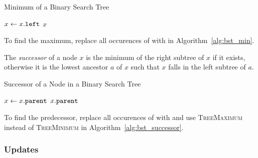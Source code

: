 \begin{algorithm}[htb]
  \caption{Minimum of a Binary Search Tree}
  \label{alg:bst_min}
  \begin{algorithmic}[1]
      \State $x\gets x\mathtt{.}\mathtt{left}$ 
      \EndWhile
      \State \Return $x$
    \EndFunction
  \end{algorithmic}
\end{algorithm}
To find the maximum, replace all occurences of  with  in Algorithm~\ref{alg:bst_min}.

\begin{definition}[Successor]
  The \emph{successor} of a node \(x\) is the minimum of the right subtree of \(x\) if it exists, otherwise it is the lowest ancestor \(a\) of \(x\) such that \(x\) falls in the left subtree of \(a\).
\end{definition}

\begin{algorithm}[htb]
  \caption{Successor of a Node in a Binary Search Tree}
  \label{alg:bst_successor}
  \begin{algorithmic}[1]
        \State \Return {} 
      \EndIf
        \State $x\gets x\mathtt{.}\mathtt{parent}$ 
      \EndWhile
      \State \Return $x\mathtt{.}\mathtt{parent}$ 
    \EndFunction
  \end{algorithmic}
\end{algorithm}
To find the predecessor, replace all occurences of  with  and use \textsc{TreeMaximum} instead of \textsc{TreeMinimum} in Algorithm~\ref{alg:bst_successor}.



\subsubsection{Updates}

